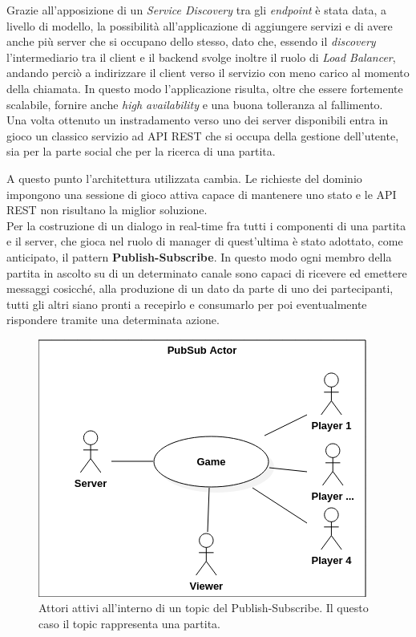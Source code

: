             Grazie all'apposizione di un \textit{Service Discovery} tra gli \textit{endpoint} è stata data, a livello di modello, la possibilità all'applicazione di aggiungere servizi e di avere anche più server che si occupano dello stesso, dato che, essendo il \textit{discovery} l'intermediario tra il client e il backend svolge inoltre il ruolo di \textit{Load Balancer}, andando perciò a indirizzare il client verso il servizio con meno carico al momento della chiamata.
            In questo modo l'applicazione risulta, oltre che essere fortemente scalabile, fornire anche \textit{high availability} e una buona tolleranza al fallimento.
            \\
            Una volta ottenuto un instradamento verso uno dei server disponibili entra in gioco un classico servizio ad API REST che si occupa della gestione dell'utente, sia per la parte social che per la ricerca di una partita.

            A questo punto l'architettura utilizzata cambia. Le richieste del dominio impongono una sessione di gioco attiva capace di mantenere uno stato e le API REST non risultano la miglior soluzione. \\
            Per la costruzione di un dialogo in real-time fra tutti i componenti di una partita e il server, che gioca nel ruolo di manager di quest'ultima è stato adottato, come anticipato, il pattern \textbf{Publish-Subscribe}.
            In questo modo ogni membro della partita in ascolto su di un determinato canale sono capaci di ricevere ed emettere messaggi cosicché, alla produzione di un dato da parte di uno dei partecipanti, tutti gli altri siano pronti a recepirlo e consumarlo per poi eventualmente rispondere tramite una determinata azione.

            \begin{figure}[h!]
                \includegraphics[scale=0.6]{images/PubSubActorDiagram.png}
                \caption{Attori attivi all'interno di un topic del Publish-Subscribe. Il questo caso il topic rappresenta una partita.}
            \end{figure}

